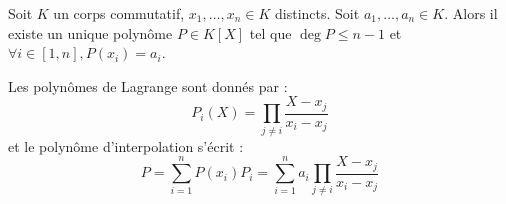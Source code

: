 \begin{thm}
Soit $K$ un corps commutatif, $x_1,\ldots,x_n \in K$ distincts. Soit $a_1,\ldots,a_n \in K$. Alors il existe un unique polynôme $P \in K[X]$ tel que $\deg P \leq n-1$ et $\forall i \in [1,n], P(x_i) = a_i$.
\end{thm}

\begin{rem}
Les polynômes de Lagrange sont donnés par :
\[ P_i(X) = \prod_{j\neq i}\frac{X - x_j}{x_i - x_j} \]
et le polynôme d'interpolation s'écrit :
\[ P = \sum_{i=1}^n P(x_i)P_i = \sum_{i=1}^n a_i\prod_{j\neq i}\frac{X - x_j}{x_i - x_j} \]
\end{rem}